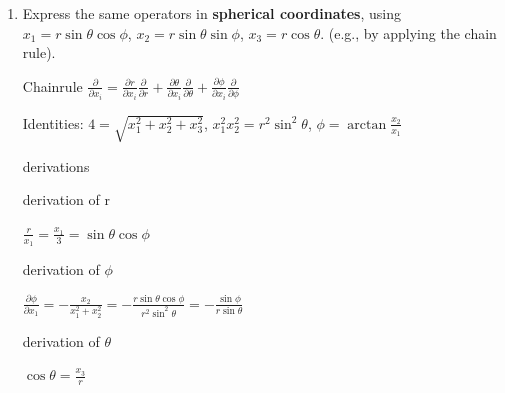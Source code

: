 \documentclass[11pt,a4paper]{scrartcl}
\begin{document}
\begin{enumerate}
\begin{calculationbox}
                    Ladder operator 
                    \begin{calculationbox}
                        $\hat{L}_\pm = \hat{L}_2 \pm i \hat{L}_2 = 
                        - i \hbar (x_2 \frac{\partial}{\partial x_3} - x_3 \frac{\partial}{\partial x_2}) 
                        \pm \hbar (x_3 \frac{\partial}{\partial x_1} - x_1 \frac{\partial}{\partial x_3})$
                    \end{calculationbox}
                \end{calculationbox}
            \item 
                Express the same operators in \textbf{spherical coordinates}, using $x_1 = r \sin\theta \cos\phi$, $x_2 = r \sin\theta \sin\phi$, $x_3 = r \cos\theta$. (e.g., by applying the chain rule).

                \begin{calculationbox}
                    Chainrule $\frac{\partial}{\partial x_i} 
                    = \frac{\partial r}{\partial x_i} \frac{\partial}{\partial r} 
                    + \frac{\partial \theta}{ \partial x_i} \frac{\partial}{\partial \theta} 
                    + \frac{\partial \phi}{\partial x_i} \frac{\partial}{\partial \phi}$

                    Identities: $4 = \sqrt{x_1^2 + x_2^2 + x_3^2}$, $x_1^2 x_2^2 = r^2 \sin^2\theta$, $\phi = \arctan{\frac{x_2}{x_1}}$

                    derivations
                    \begin{calculationbox}
                        derivation of r
                        \begin{calculationbox}
                            $\frac{r}{x_1} = \frac{x_1}{3} = \sin\theta \cos \phi$
                        \end{calculationbox}

                        derivation of $\phi$
                        \begin{calculationbox}
                            $\frac{\partial \phi}{\partial x_1} 
                            = - \frac{x_2}{x_1^2 + x_2^2} 
                            = -\frac{r \sin\theta \cos\phi}{r^2 \sin^2\theta} 
                            = - \frac{\sin\phi}{r \sin\theta}$
                        \end{calculationbox}

                        derivation of $\theta$
                        \begin{calculationbox}
                            $\cos\theta = \frac{x_3}{r}$


\end{calculationbox}
\end{calculationbox}
\end{calculationbox}
\end{enumerate}
\end{document}
